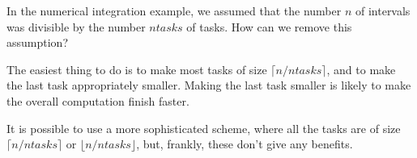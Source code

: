 \begin{nontutequestion}
In the numerical integration example, we assumed that the number $n$ of
intervals was divisible by the number $ntasks$ of tasks.  How can
we remove this assumption?
\end{nontutequestion}


\begin{nontuteanswer}
The easiest thing to do is to make most tasks of size $\lceil n/ntasks
\rceil$, and to make the last task appropriately smaller.  Making the last
task smaller is likely to make the overall computation finish faster.

It is possible to use a more sophisticated scheme, where all the tasks are of
size $\lceil n/ntasks \rceil$ or $\lfloor n/ntasks \rfloor$, but, frankly,
these don't give any benefits.
\end{nontuteanswer}
